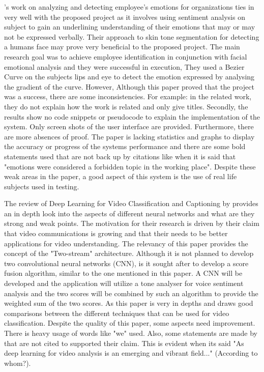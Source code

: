 \citealp{SUBHASHINI}'s work on analyzing and detecting employee's emotions for organizations ties in very well with the proposed project as it involves using sentiment analysis on subject to gain an underlining understanding of their emotions that may or may not be expressed verbally. Their approach to skin tone segmentation for detecting a humans face may prove very beneficial to the proposed project. The main research goal was to achieve employee identification in conjunction with facial emotional analysis and they were successful in execution, They used a Bezier Curve on the subjects lips and eye to detect the emotion expressed by analysing the gradient of the curve. However, Although this paper proved that the project was a success, there are some inconsistencies. For example: in the related work, they do not explain how the work is related and only give titles. Secondly, the results show no code snippets or pseudocode to explain the implementation of the system. Only screen shots of the user interface are provided. Furthermore, there are more absences of proof. The paper is lacking statistics and graphs to display the accuracy or progress of the systems performance and there are some bold statements used that are not back up by citations like when it is said that "emotions were considered a forbidden topic in the working place". Despite these weak areas in the paper, a good aspect of this system is the use of real life subjects used in testing. 

The review of Deep Learning for Video Classification and Captioning by \citeauthor{Wu} provides an in depth look into the aspects of different neural networks and what are they strong and weak points. The motivation for their research is driven by their claim that video communications is growing and that their needs to be better applications for video understanding. The relevancy of this paper provides the concept of the "Two-stream" architecture. Although it is not planned to develop two convolutional neural networks (CNN), is it sought after to develop a score fusion algorithm, similar to the one mentioned in this paper. A CNN will be developed and the application will utilize a tone analyser for voice sentiment analysis and the two scores will be combined by such an algorithm to provide
the weighted sum of the two scores. As this paper is very in depths and draws good comparisons between the different techniques that can be used for video classification. Despite the quality of this paper, some aspects need improvement. There is heavy usage of words like "we" used. Also, some statements are made by \citep{Wu} that are not cited to supported their claim. This is evident when its said "As deep learning for video analysis is an emerging and vibrant field..." (According to whom?).


